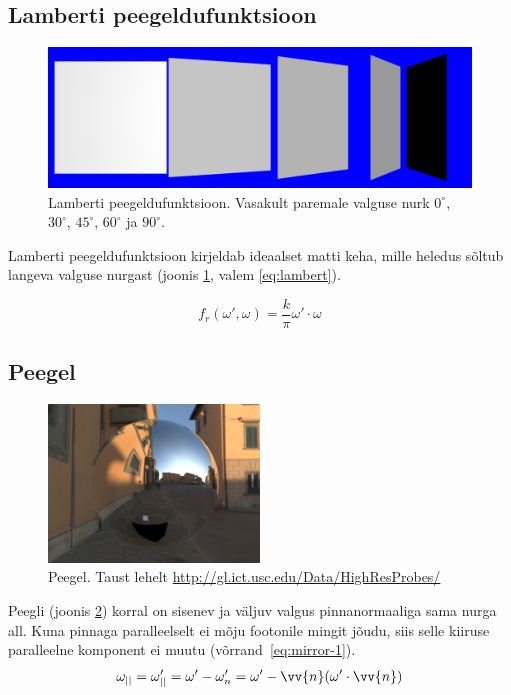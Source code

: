 \documentclass[a4paper,12pt]{report}
\renewcommand{\vec}[1]{\vv{#1}}
\begin{document}
\subsection{Lamberti peegeldufunktsioon}
\label{subsec:lambert}
\begin{figure}
\includegraphics[width=\textwidth]{lambert}
\caption[Lamberti peegeldufunktsioon]{Lamberti peegeldufunktsioon.
Vasakult paremale valguse nurk \(0^\circ\), \(30^\circ\), \(45^\circ\),
\(60^\circ\) ja \(90^\circ\).}
\label{fig:lambert}
\end{figure}
Lamberti peegeldufunktsioon kirjeldab ideaalset matti keha, mille heledus
sõltub langeva valguse nurgast (joonis \ref{fig:lambert}, valem \ref{eq:lambert}).

\begin{equation} \label{eq:lambert}
f_r(\omega', \omega) = \frac k\pi \omega' \cdot \omega
\end{equation}

\subsection{Peegel} 
\label{subsec:peegel}
\begin{figure}
\includegraphics[width=0.499\textwidth]{mirror}
\caption[Peegel]{Peegel. Taust lehelt \url{http://gl.ict.usc.edu/Data/HighResProbes/}}
\label{fig:mirror}
\end{figure}

Peegli (joonis \ref{fig:mirror}) korral on sisenev ja väljuv valgus pinnanormaaliga sama nurga all.
Kuna pinnaga paralleelselt ei mõju footonile mingit jõudu, siis selle
kiiruse paralleelne komponent ei muutu (võrrand~\ref{eq:mirror-1}).
\begin{equation} \label{eq:mirror-1}
\omega_{||} = \omega'_{||} = \omega' - \omega'_{n} = \omega' -\vec n(\omega'\cdot\vec n)
\end{equation}
\end{document}
